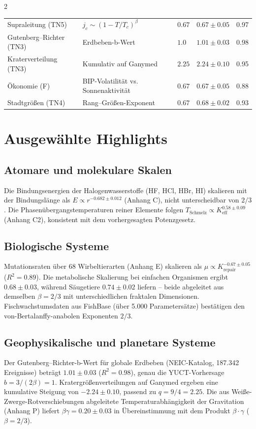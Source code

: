 \documentclass[11pt,a4paper]{article}
\newcommand{\betaf}{\beta}
\begin{document}
\begin{multicols}{2}
\begin{table}[htbp]
\begin{tabular}{p{3.5cm}p{5.0cm}p{2.1cm}p{3.5cm}p{1.4cm}}
				Supraleitung (TN5) & \(j_c \sim (1-T/T_c)^{\beta}\) & \(0.67\) & \(0.67 \pm 0.05\) & 0.97 \\
				Gutenberg–Richter (TN3) & Erdbeben-b-Wert & \(1.0\) & \(1.01 \pm 0.03\) & 0.98 \\
				Kraterverteilung (TN3) & Kumulativ auf Ganymed & \(2.25\) & \(2.24 \pm 0.10\) & 0.95 \\
				Ökonomie (F) & BIP-Volatilität vs. Sonnenaktivität & \(0.67\) & \(0.67 \pm 0.05\) & 0.88 \\
				Stadtgrößen (TN4) & Rang–Größen-Exponent & \(0.67\) & \(0.68 \pm 0.02\) & 0.93 \\
				\bottomrule
			\end{tabular}
		\end{table}
		
		\section{Ausgewählte Highlights}
		
		\subsection{Atomare und molekulare Skalen}
		Die Bindungsenergien der Halogenwasserstoffe (HF, HCl, HBr, HI) skalieren mit der Bindungslänge als \(E \propto r^{-0.682\pm0.012}\) (Anhang C), nicht unterscheidbar von \(2/3\). Die Phasenübergangstemperaturen reiner Elemente folgen \(T_{\text{Schmelz}} \propto K_{\mathrm{eff}}^{0.58\pm0.09}\) (Anhang C2), konsistent mit dem vorhergesagten Potenzgesetz.
		
		\subsection{Biologische Systeme}
		Mutationsraten über 68 Wirbeltierarten (Anhang E) skalieren als \(\mu \propto K_{\mathrm{repair}}^{-0.67\pm0.05}\) (\(R^2=0.89\)). Die metabolische Skalierung bei einfachen Organismen ergibt \(0.68\pm0.03\), während Säugetiere \(0.74\pm0.02\) liefern – beide abgeleitet aus demselben \(\betaf = 2/3\) mit unterschiedlichen fraktalen Dimensionen. Fischwachstumsdaten aus FishBase (über 5.000 Parametersätze) bestätigen den von-Bertalanffy-anabolen Exponenten \(2/3\).
		
		\subsection{Geophysikalische und planetare Systeme}
		Der Gutenberg–Richter-b-Wert für globale Erdbeben (NEIC-Katalog, 187.342 Ereignisse) beträgt \(1.01\pm0.03\) (\(R^2=0.98\)), genau die YUCT-Vorhersage \(b = 3/(2\betaf) = 1\). Kratergrößenverteilungen auf Ganymed ergeben eine kumulative Steigung von \(-2.24\pm0.10\), passend zu \(q = 9/4 = 2.25\). Die aus Weiße-Zwerge-Rotverschiebungen abgeleitete Temperaturabhängigkeit der Gravitation (Anhang P) liefert \(\beta\gamma = 0.20 \pm 0.03\) in Übereinstimmung mit dem Produkt \(\betaf \cdot \gamma\) (\(\betaf = 2/3\)).
		

\end{multicols}
\end{document}
